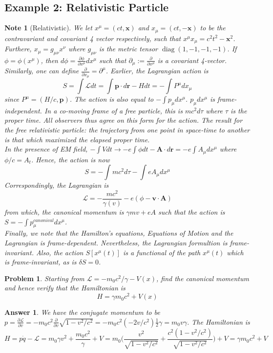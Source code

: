 \documentclass[a4paper]{article}
\DeclareMathOperator{\diag}{diag}
\newtheorem{ans}{Answer}[subsection]
\newtheorem{note}{Note}[section]
\theoremstyle{new}
\newtheorem{qns}{Problem}[section]
\begin{document}
\subsection{Example 2: Relativistic Particle}
\begin{note}[Relativistic]
We let $x^\mu=(ct,\mathbf{x})$ and $x_\mu=(ct,-\mathbf{x})$ to be the contravariant and covariant 4 vector respectively, such that $x^\mu x_\mu=c^2t^2-\mathbf{x}^2$. Furthere, $x_\mu=g_{\mu\nu}x^\nu$ where $g_{\mu\nu}$ is the metric tensor $\diag(1,-1,-1,-1)$. If $\phi=\phi(x^\mu)$, then $d\phi=\frac{\partial\phi}{\partial x^\mu}dx^\mu$ such that $\partial_\mu:=\frac{\partial}{\partial x^\mu}$ is a covariant 4-vector. Similarly, one can define $\frac{\partial}{\partial x_\mu}=\partial^\mu$. Earlier, the Lagrangian action is
$$S=\int\mathcal{L}dt=\int\mathbf{p}\cdot d\mathbf{r}-Hdt=-\int P^\mu dx_\mu$$
since $P^\mu=(H/c,\mathbf{p})$. The action is also equal to $-\int p_\mu dx^\mu$. $p_\mu dx^\mu$ is frame-independent. In a co-moving frame of a free particle, this is $mc^2d\tau$ where $\tau$ is the proper time. All observers thus agree on this form for the action. The result for the free relativistic particle: the trajectory from one point in space-time to another is that which maximized the elapsed proper time.\\[5pt]
In the presence of EM field, $-\int Vdt\rightarrow -e\int\phi dt-\mathbf{A}\cdot d\mathbf{r}=-e\int A_\mu dx^\mu$ where $\phi/c=A_t$. Hence, the action is now
$$S=-\int mc^2d\tau-\int eA_\mu dx^\mu$$
Correspondingly, the Lagrangian is
$$\mathcal{L}=-\frac{mc^2}{\gamma(v)}-e(\phi-\mathbf{v}\cdot\mathbf{A})$$
from which, the canonical momentum is $\gamma mv+eA$ such that the action is $S=-\int p^{canonical}_\mu dx^\mu$.\\[5pt]
Finally, we note that the Hamilton's equations, Equations of Motion and the Lagrangian is frame-dependent. Nevertheless, the Lagrangian formultion is frame-invariant. Also, the action $S[x^\mu(t)]$ is a functional of the path $x^\mu(t)$ which is frame-invariant, as is $\delta S=0$.
\end{note}
\begin{qns}
Starting from $\mathcal{L}=-m_0c^2/\gamma -V(x)$, find the canonical momentum and hence verify that the Hamiltonian is
$$H=\gamma m_0c^2+V(x)$$
\end{qns}
\begin{ans}
We have the conjugate momentum to be $p=\frac{\partial\mathcal{L}}{\partial v}=-m_0c^2\frac{\partial}{\partial v}\sqrt{1-v^2/c^2}=-m_0c^2(-2v/c^2)\frac{1}{2}\gamma=m_0v\gamma$. The Hamiltonian is 
$$H=p\dot{q}-\mathcal{L}=m_0\gamma v^2+\frac{m_0c^2}{\gamma}+V=m_0\bigg(\frac{v^2}{\sqrt{1-v^2/c^2}}+\frac{c^2(1-v^2/c^2)}{\sqrt{1-v^2/c^2}}\bigg)+V=\gamma m_0c^2+V$$
\end{ans}
\end{document}
